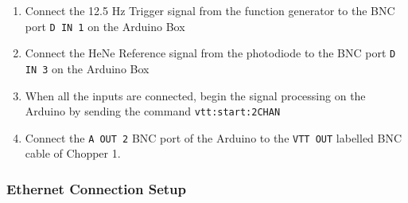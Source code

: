 \documentclass{article}
\begin{document}
\begin{enumerate}[label=\textbf{\arabic*}]
            \item Connect the 12.5 Hz Trigger signal from the function generator to the BNC port \texttt{D IN 1} on the Arduino Box
            \item Connect the HeNe Reference signal from the photodiode to the BNC port \texttt{D IN 3} on the Arduino Box
            \item When all the inputs are connected, begin the signal processing on the Arduino by sending the command \texttt{vtt:start:2CHAN}
            \item Connect the \texttt{A OUT 2} BNC port of the Arduino to the \texttt{VTT OUT} labelled BNC cable of Chopper 1.
        \end{enumerate}
        
        \subsubsection{Ethernet Connection Setup}
        
\end{document}
